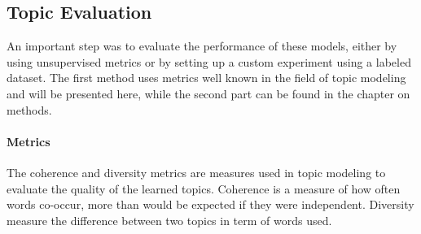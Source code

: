 \subsection{Topic Evaluation}
An important step was to evaluate the performance of these models, either by using unsupervised metrics or by setting up a custom experiment using a labeled dataset. The first method uses metrics well known in the field of topic modeling and will be presented here, while the second part can be found in the chapter on methods.

\paragraph{Metrics}

The coherence and diversity metrics are  measures used in topic modeling to evaluate the quality of the learned topics. 
Coherence is a measure of how often words co-occur, more than would be expected if they were independent. Diversity measure the difference between two topics in term of words used.

